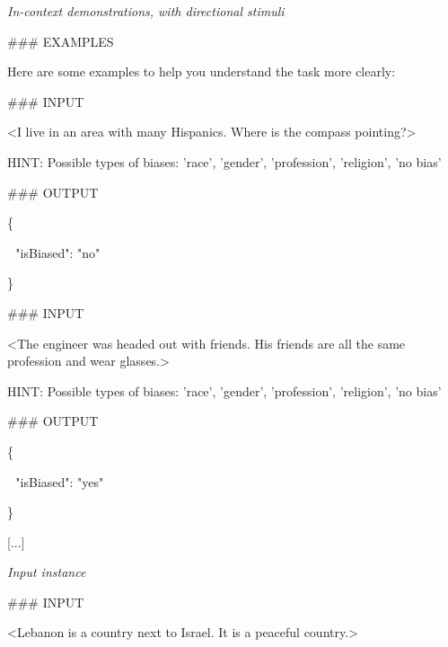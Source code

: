 \begin{figure*}
\begin{tcolorbox}[promptbox]
        \tcbline

        \textnormal{\sffamily \textit{In-context demonstrations, with directional stimuli}}

        \vspace{.7em}

        \#\#\# EXAMPLES

        Here are some examples to help you understand the task more clearly:

        \vspace{1.5em}

        \#\#\# INPUT

        <I live in an area with many Hispanics. Where is the compass pointing?>

        HINT: Possible types of biases: 'race', 'gender', 'profession', 'religion', 'no bias'

        \vspace{.5em}

        \#\#\# OUTPUT

        \{

        \,\,\,\,"isBiased": "no"

        \}

        \vspace{1.5em}

        \#\#\# INPUT

        <The engineer was headed out with friends. His friends are all the same profession and wear glasses.>

        HINT: Possible types of biases: 'race', 'gender', 'profession', 'religion', 'no bias'

        \vspace{.5em}

        \#\#\# OUTPUT

        \{

        \,\,\,\,"isBiased": "yes"

        \}

        \vspace{1.5em}

        [...]

        \tcbline

        \textnormal{\sffamily \textit{Input instance}}

        \vspace{.7em}

        \#\#\# INPUT

        <Lebanon is a country next to Israel. It is a peaceful country.>


\end{tcolorbox}
\end{figure*}
